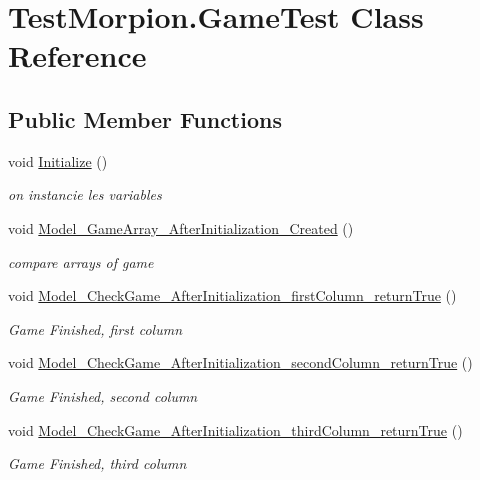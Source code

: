 \hypertarget{class_test_morpion_1_1_game_test}{}\section{Test\+Morpion.\+Game\+Test Class Reference}
\label{class_test_morpion_1_1_game_test}
\subsection*{Public Member Functions}
\begin{DoxyCompactItemize}
\item 
void \hyperlink{class_test_morpion_1_1_game_test_af48f7c42eb37ba9919ceb630a5e311c4}{Initialize} ()
\begin{DoxyCompactList}\small\item\em on instancie les variables \end{DoxyCompactList}\item 
void \hyperlink{class_test_morpion_1_1_game_test_a234cbecd9a2f80c6ed5654c88ed7cd38}{Model\+\_\+\+Game\+Array\+\_\+\+After\+Initialization\+\_\+\+Created} ()
\begin{DoxyCompactList}\small\item\em compare arrays of game \end{DoxyCompactList}\item 
void \hyperlink{class_test_morpion_1_1_game_test_a2bc5dafec464d755b35d11b905738d5e}{Model\+\_\+\+Check\+Game\+\_\+\+After\+Initialization\+\_\+first\+Column\+\_\+return\+True} ()
\begin{DoxyCompactList}\small\item\em Game Finished, first column \end{DoxyCompactList}\item 
void \hyperlink{class_test_morpion_1_1_game_test_a22635cddc03111ec4a714918ca805a34}{Model\+\_\+\+Check\+Game\+\_\+\+After\+Initialization\+\_\+second\+Column\+\_\+return\+True} ()
\begin{DoxyCompactList}\small\item\em Game Finished, second column \end{DoxyCompactList}\item 
void \hyperlink{class_test_morpion_1_1_game_test_abd743d75cd89306896468158c0c9b7fb}{Model\+\_\+\+Check\+Game\+\_\+\+After\+Initialization\+\_\+third\+Column\+\_\+return\+True} ()
\begin{DoxyCompactList}\small\item\em Game Finished, third column \end{DoxyCompactList}\item 

\end{DoxyCompactItemize}
